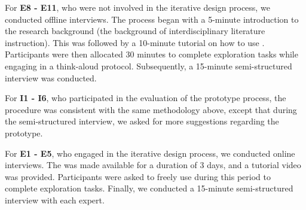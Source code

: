 For \textbf{E8 - E11}, who were not involved in the iterative design process, we conducted offline interviews. The process began with a 5-minute introduction to the research background (\ie the background of interdisciplinary literature instruction). 
This was followed by a 10-minute tutorial on how to use \name{}. 
Participants were then allocated 30 minutes to complete exploration tasks while engaging in a think-aloud protocol. Subsequently, a 15-minute semi-structured interview was conducted.

For \textbf{I1 - I6}, who participated in the evaluation of the prototype process, the procedure was consistent with the same methodology above, except that during the semi-structured interview, we asked for more suggestions regarding the prototype.

For \textbf{E1 - E5}, who engaged in the iterative design process, we conducted online interviews. The \name{} was made available for a duration of 3 days, and a tutorial video was provided. Participants were asked to freely use \name{} during this period to complete exploration tasks. Finally, we conducted a 15-minute semi-structured interview with each expert.





